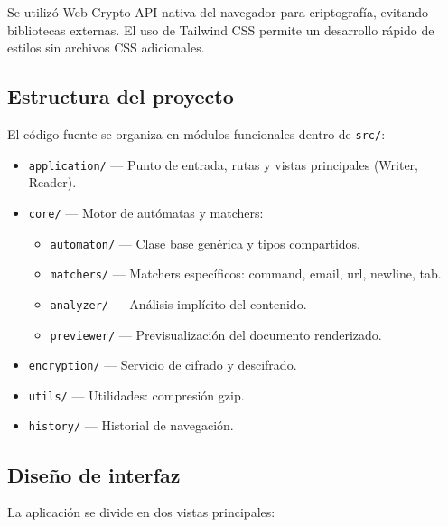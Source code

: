 \documentclass[12pt,letterpaper]{article}
\begin{document}
Se utilizó Web Crypto API nativa del navegador para criptografía, evitando bibliotecas externas. El uso de Tailwind CSS permite un desarrollo rápido de estilos sin archivos CSS adicionales.

\subsection{Estructura del proyecto}
El código fuente se organiza en módulos funcionales dentro de \texttt{src/}:

\begin{itemize}
    \item \texttt{application/} — Punto de entrada, rutas y vistas principales (Writer, Reader).
    \item \texttt{core/} — Motor de autómatas y matchers:
        \begin{itemize}
            \item \texttt{automaton/} — Clase base genérica y tipos compartidos.
            \item \texttt{matchers/} — Matchers específicos: command, email, url, newline, tab.
            \item \texttt{analyzer/} — Análisis implícito del contenido.
            \item \texttt{previewer/} — Previsualización del documento renderizado.
        \end{itemize}
    \item \texttt{encryption/} — Servicio de cifrado y descifrado.
    \item \texttt{utils/} — Utilidades: compresión gzip.
    \item \texttt{history/} — Historial de navegación.
\end{itemize}

\subsection{Diseño de interfaz}
La aplicación se divide en dos vistas principales:
\end{document}
